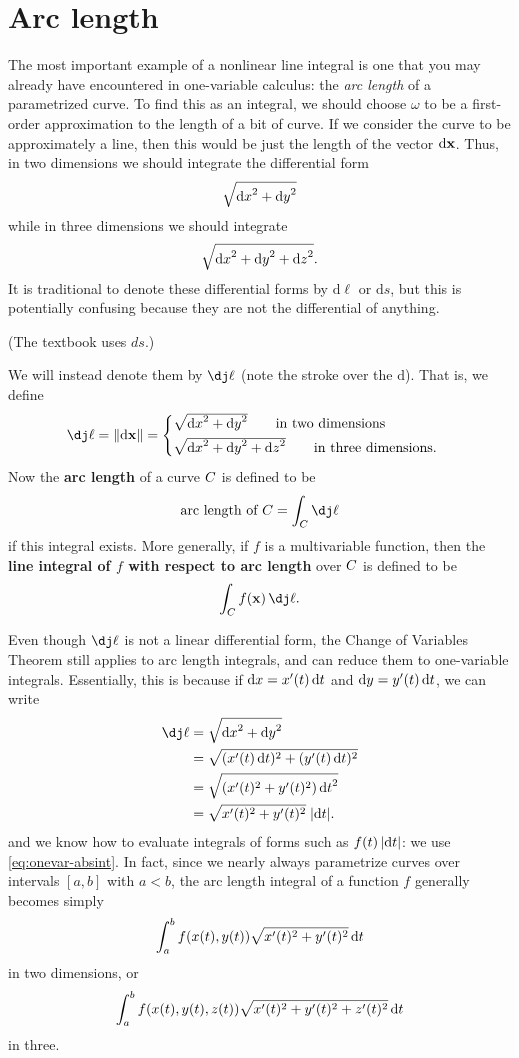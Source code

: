 \documentclass[12pt]{amsart}
\begin{document}

\section{Arc length}
\label{sec:arc-length}

The most important example of a nonlinear line integral is one that you may already have encountered in one-variable calculus: the \emph{arc length} of a parametrized curve.
To find this as an integral, we should choose $\omega$ to be a first-order approximation to the length of a bit of curve.
If we consider the curve to be approximately a line, then this would be just the length of the vector ${\mathrm{d} \mathbf{x}}$.
Thus, in two dimensions we should integrate the differential form
\[ \sqrt{{\mathrm{d} x}^2+{\mathrm{d} y}^2}\]
while in three dimensions we should integrate
\[ \sqrt{{\mathrm{d} x}^2+{\mathrm{d} y}^2 + {\mathrm{d} z}^2}.\]
It is traditional to denote these differential forms by $\mathrm{d}\ell$ or $\mathrm{d}s$, but this is potentially confusing because they are not the differential of anything.
\begin{stewart}(The textbook uses $ds$.)\end{stewart}
We will instead denote them by $\dl$ (note the stroke over the $\mathrm{d}$).
That is, we define
\[ \dl = \mgn{\dpx} =
\begin{cases}
  \sqrt{\dx^2+\dy^2}\qquad\text{in two dimensions}\\[3pt]
  \sqrt{\dx^2+\dy^2+\dz^2}\qquad\text{in three dimensions}.
\end{cases}\]
Now the \textbf{arc length} of a curve $C$ is defined to be
\[ \text{arc length of } \curve = \lint{\curve} \dl \]
if this integral exists.
More generally, if $f$ is a multivariable function, then the \textbf{line integral of $f$ with respect to arc length} over $C$ is defined to be
\[ \lint{\curve} f(\pt{x})\,\dl. \]

Even though $\dl$ is not a linear differential form, the Change of Variables Theorem still applies to arc length integrals, and can reduce them to one-variable integrals.
Essentially, this is because if ${\mathrm{d} x} = x'(t) \,{\mathrm{d} t}$ and ${\mathrm{d} y} = y'(t)\,{\mathrm{d} t}$, we can write
\begin{align*}
  \dl &= \sqrt{\dx^2+\dy^2}\\
  &= \sqrt{(x'(t)\,\dt)^2 + (y'(t)\,\dt)^2}\\
  &= \sqrt{(x'(t)^2 + y'(t)^2) \,\dt^2}\\
  &= \sqrt{x'(t)^2 + y'(t)^2} \;|\dt|.
\end{align*}
and we know how to evaluate integrals of forms such as $f(t)\,|{\mathrm{d} t}|$: we use \cref{eq:onevar-absint}.
In fact, since we nearly always parametrize curves over intervals $[a,b]$ with $a<b$, the arc length integral of a function $f$ generally becomes simply
\[ \int_a^b f(x(t),y(t)) \sqrt{x'(t)^2 + y'(t)^2} \,{\mathrm{d} t} \]
in two dimensions, or
\[ \int_a^b f(x(t),y(t),z(t)) \sqrt{x'(t)^2 + y'(t)^2+z'(t)^2} \,{\mathrm{d} t} \]
in three.
\end{document}
